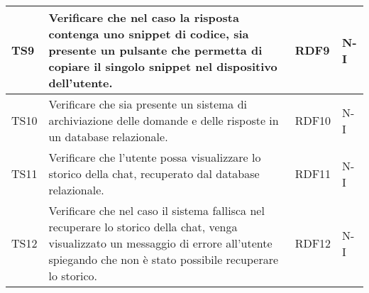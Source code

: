 \begin{table}[h!]
\begin{tabularx}{\textwidth}{|p{}|X|p{}|p{}|}
    TS9 & Verificare che nel caso la risposta contenga uno snippet di codice, sia presente un pulsante che permetta di copiare il singolo snippet nel dispositivo dell'utente. & RDF9 & N-I \\ \hline
    TS10 & Verificare che sia presente un sistema di archiviazione delle domande e delle risposte in un database relazionale. & RDF10 & N-I \\ \hline
    TS11 & Verificare che l'utente possa visualizzare lo storico della chat, recuperato dal database relazionale. & RDF11 & N-I \\ \hline
    TS12 & Verificare che nel caso il sistema fallisca nel recuperare lo storico della chat, venga visualizzato un messaggio di errore all'utente spiegando che non è stato possibile recuperare lo storico. & RDF12 & N-I \\ \hline
   \end{tabularx}
\end{table}

\newpage


